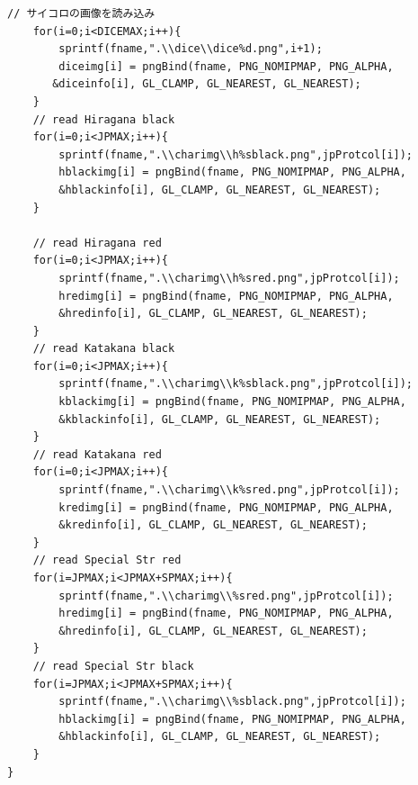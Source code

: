 \documentclass[a4j]{jarticle}
\begin{document}
\begin{lstlisting}[basicstyle=\ttfamily\footnotesize, frame=single,label=readImg,caption=readImg関数]
    // サイコロの画像を読み込み
    for(i=0;i<DICEMAX;i++){
        sprintf(fname,".\\dice\\dice%d.png",i+1);
        diceimg[i] = pngBind(fname, PNG_NOMIPMAP, PNG_ALPHA, 
       &diceinfo[i], GL_CLAMP, GL_NEAREST, GL_NEAREST);
    }
    // read Hiragana black
    for(i=0;i<JPMAX;i++){
        sprintf(fname,".\\charimg\\h%sblack.png",jpProtcol[i]);
        hblackimg[i] = pngBind(fname, PNG_NOMIPMAP, PNG_ALPHA, 
        &hblackinfo[i], GL_CLAMP, GL_NEAREST, GL_NEAREST);
    }

    // read Hiragana red
    for(i=0;i<JPMAX;i++){
        sprintf(fname,".\\charimg\\h%sred.png",jpProtcol[i]);
        hredimg[i] = pngBind(fname, PNG_NOMIPMAP, PNG_ALPHA, 
        &hredinfo[i], GL_CLAMP, GL_NEAREST, GL_NEAREST);
    }
    // read Katakana black
    for(i=0;i<JPMAX;i++){
        sprintf(fname,".\\charimg\\k%sblack.png",jpProtcol[i]);
        kblackimg[i] = pngBind(fname, PNG_NOMIPMAP, PNG_ALPHA, 
        &kblackinfo[i], GL_CLAMP, GL_NEAREST, GL_NEAREST);
    }
    // read Katakana red
    for(i=0;i<JPMAX;i++){
        sprintf(fname,".\\charimg\\k%sred.png",jpProtcol[i]);
        kredimg[i] = pngBind(fname, PNG_NOMIPMAP, PNG_ALPHA, 
        &kredinfo[i], GL_CLAMP, GL_NEAREST, GL_NEAREST);
    }
    // read Special Str red
    for(i=JPMAX;i<JPMAX+SPMAX;i++){
        sprintf(fname,".\\charimg\\%sred.png",jpProtcol[i]);
        hredimg[i] = pngBind(fname, PNG_NOMIPMAP, PNG_ALPHA, 
        &hredinfo[i], GL_CLAMP, GL_NEAREST, GL_NEAREST);
    }
    // read Special Str black
    for(i=JPMAX;i<JPMAX+SPMAX;i++){
        sprintf(fname,".\\charimg\\%sblack.png",jpProtcol[i]);
        hblackimg[i] = pngBind(fname, PNG_NOMIPMAP, PNG_ALPHA, 
        &hblackinfo[i], GL_CLAMP, GL_NEAREST, GL_NEAREST);
    }
}
                  \end{lstlisting} 

      
\end{document}
